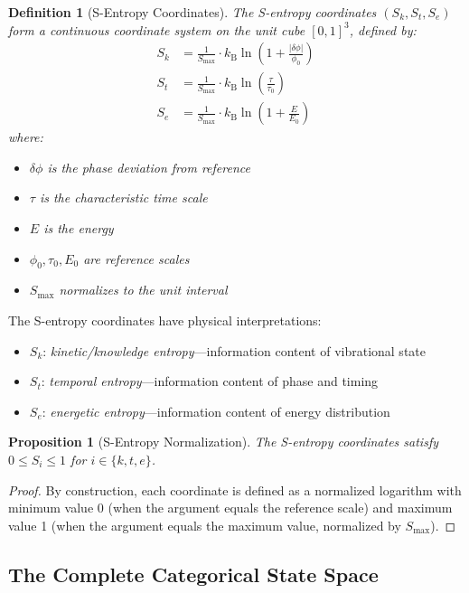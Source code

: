 \documentclass[twocolumn,10pt,twoside]{article}
\newtheorem{proposition}[theorem]{Proposition}
\newtheorem{definition}[theorem]{Definition}
\newcommand{\kb}{k_{\mathrm{B}}}
\newcommand{\sentcoord}{(S_k,S_t,S_e)}
\begin{document}
\begin{definition}[S-Entropy Coordinates]
\label{def:s_entropy}
The S-entropy coordinates $\sentcoord$ form a continuous coordinate system on the unit cube $[0,1]^3$, defined by:
\begin{align}
S_k &= \frac{1}{S_{\max}} \cdot \kb \ln\left(1 + \frac{|\delta\phi|}{\phi_0}\right) \label{eq:Sk}\\
S_t &= \frac{1}{S_{\max}} \cdot \kb \ln\left(\frac{\tau}{\tau_0}\right) \label{eq:St}\\
S_e &= \frac{1}{S_{\max}} \cdot \kb \ln\left(1 + \frac{E}{E_0}\right) \label{eq:Se}
\end{align}
where:
\begin{itemize}
    \item $\delta\phi$ is the phase deviation from reference
    \item $\tau$ is the characteristic time scale
    \item $E$ is the energy
    \item $\phi_0, \tau_0, E_0$ are reference scales
    \item $S_{\max}$ normalizes to the unit interval
\end{itemize}
\end{definition}

The S-entropy coordinates have physical interpretations:
\begin{itemize}
    \item $S_k$: \textit{kinetic/knowledge entropy}---information content of vibrational state
    \item $S_t$: \textit{temporal entropy}---information content of phase and timing
    \item $S_e$: \textit{energetic entropy}---information content of energy distribution
\end{itemize}

\begin{proposition}[S-Entropy Normalization]
The S-entropy coordinates satisfy $0 \leq S_i \leq 1$ for $i \in \{k, t, e\}$.
\end{proposition}

\begin{proof}
By construction, each coordinate is defined as a normalized logarithm with minimum value 0 (when the argument equals the reference scale) and maximum value 1 (when the argument equals the maximum value, normalized by $S_{\max}$).
\end{proof}

\subsection{The Complete Categorical State Space}
\end{document}
